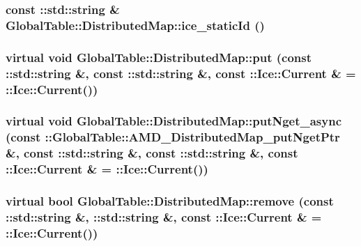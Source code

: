 \label{class_global_table_1_1_distributed_map_a1647e32806d42ace0aecb773bd96959f}
\hypertarget{class_global_table_1_1_distributed_map_a8c59ff096e7f3257afbaa41c3d6e6905}{
\subsubsection[{ice\_\-staticId}]{\setlength{\rightskip}{0pt plus 5cm}const ::std::string \& GlobalTable::DistributedMap::ice\_\-staticId ()}}
\label{class_global_table_1_1_distributed_map_a8c59ff096e7f3257afbaa41c3d6e6905}
\hypertarget{class_global_table_1_1_distributed_map_a13884a4b83237c7f4809f162ed470404}{
\subsubsection[{put}]{\setlength{\rightskip}{0pt plus 5cm}virtual void GlobalTable::DistributedMap::put (const ::std::string \&, \/  const ::std::string \&, \/  const ::Ice::Current \& = {\ttfamily ::Ice::Current()})}}
\label{class_global_table_1_1_distributed_map_a13884a4b83237c7f4809f162ed470404}
\hypertarget{class_global_table_1_1_distributed_map_a32186a130b563bcc04707277dd3e600b}{
\subsubsection[{putNget\_\-async}]{\setlength{\rightskip}{0pt plus 5cm}virtual void GlobalTable::DistributedMap::putNget\_\-async (const ::{\bf GlobalTable::AMD\_\-DistributedMap\_\-putNgetPtr} \&, \/  const ::std::string \&, \/  const ::std::string \&, \/  const ::Ice::Current \& = {\ttfamily ::Ice::Current()})}}
\label{class_global_table_1_1_distributed_map_a32186a130b563bcc04707277dd3e600b}
\hypertarget{class_global_table_1_1_distributed_map_af961f29730e0bb80e3c8a9fd2ce0a5a7}{
\subsubsection[{remove}]{\setlength{\rightskip}{0pt plus 5cm}virtual bool GlobalTable::DistributedMap::remove (const ::std::string \&, \/  ::std::string \&, \/  const ::Ice::Current \& = {\ttfamily ::Ice::Current()})}}
